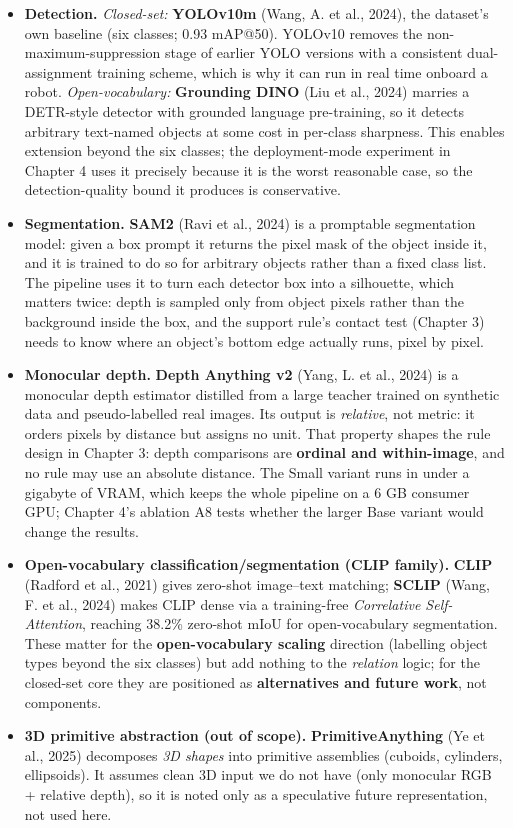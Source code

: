 \begin{itemize}
\item \textbf{Detection.} \textit{Closed-set:} \textbf{YOLOv10m} (Wang, A. et al., 2024), the
dataset's own baseline (six classes; 0.93 mAP@50). YOLOv10 removes the non-maximum-suppression stage of earlier YOLO versions with a consistent dual-assignment training scheme, which is why it can run in real time onboard a robot. \textit{Open-vocabulary:} \textbf{Grounding DINO} (Liu et al., 2024) marries a DETR-style detector with grounded language pre-training, so it detects arbitrary text-named objects at some cost in per-class sharpness. This enables extension beyond the six classes; the deployment-mode experiment in Chapter 4 uses it precisely because it is the worst reasonable case, so the detection-quality bound it produces is conservative.
\item \textbf{Segmentation.} \textbf{SAM2} (Ravi et al., 2024) is a promptable segmentation
model: given a box prompt it returns the pixel mask of the object inside it, and it is trained to do so for arbitrary objects rather than a fixed class list. The pipeline uses it to turn each detector box into a silhouette, which matters twice: depth is sampled only from object pixels rather than the background inside the box, and the support rule's contact test (Chapter 3) needs to know where an object's bottom edge actually runs, pixel by pixel.
\item \textbf{Monocular depth.} \textbf{Depth Anything v2} (Yang, L. et al., 2024) is a monocular
depth estimator distilled from a large teacher trained on synthetic data and pseudo-labelled real images. Its output is \textit{relative}, not metric: it orders pixels by distance but assigns no unit. That property shapes the rule design in Chapter 3: depth comparisons are \textbf{ordinal and within-image}, and no rule may use an absolute distance. The Small variant runs in under a gigabyte of VRAM, which keeps the whole pipeline on a 6 GB consumer GPU; Chapter 4's ablation A8 tests whether the larger Base variant would change the results.
\item \textbf{Open-vocabulary classification/segmentation (CLIP family).} \textbf{CLIP}
(Radford et al., 2021) gives zero-shot image--text matching; \textbf{SCLIP} (Wang, F. et al., 2024) makes CLIP dense via a training-free \textit{Correlative Self-Attention}, reaching 38.2\% zero-shot mIoU for open-vocabulary segmentation. These matter for the \textbf{open-vocabulary scaling} direction (labelling object types beyond the six classes) but add nothing to the \textit{relation} logic; for the closed-set core they are positioned as \textbf{alternatives and future work}, not components.
\item \textbf{3D primitive abstraction (out of scope).} \textbf{PrimitiveAnything}
(Ye et al., 2025) decomposes \textit{3D shapes} into primitive assemblies (cuboids, cylinders, ellipsoids). It assumes clean 3D input we do not have (only monocular RGB + relative depth), so it is noted only as a speculative future representation, not used here.
\end{itemize}


